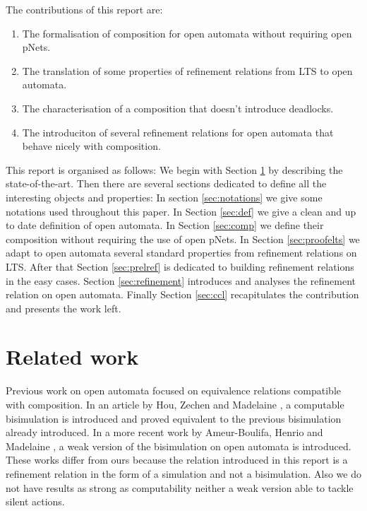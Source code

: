 \documentclass{article}
\begin{document}
The contributions of this report are:
\begin{enumerate}
\item The formalisation of composition for open automata without requiring open pNets.
\item The translation of some properties of refinement relations from LTS to open automata.
\item The characterisation of a composition that doesn't introduce deadlocks.
\item The introduciton of several refinement relations for open automata that behave nicely with composition.
\end{enumerate}
This report is organised as follows:
We begin with Section \ref{sec:sota} by describing the state-of-the-art.
Then there are several sections dedicated to define all the interesting objects and properties:
In section \ref{sec:notations} we give some notations used throughout this paper.
In Section \ref{sec:def} we give a clean and up to date definition of open automata.
In Section \ref{sec:comp} we define their composition without requiring the use of open pNets.
In Section \ref{sec:proofelts} we adapt to open automata several standard properties from refinement relations on LTS.
After that Section \ref{sec:prelref} is dedicated to building refinement relations in the easy cases.
Section \ref{sec:refinement} introduces and analyses the refinement relation on open automata.
Finally Section \ref{sec:ccl} recapitulates the contribution and presents the work left.


\section{Related work}\label{sec:sota}
Previous work on open automata focused on equivalence relations compatible with composition.
In an article by Hou, Zechen and Madelaine \cite{10.1145/3372884.3373161}, a computable bisimulation is introduced and proved equivalent to the previous bisimulation already introduced.
In a more recent work by Ameur-Boulifa, Henrio and Madelaine \cite{2007.10770}, a weak version of the bisimulation on open automata is introduced.
These works differ from ours because the relation introduced in this report is a refinement relation in the form of a simulation and not a bisimulation.
Also we do not have results as strong as computability neither a weak version able to tackle silent actions.
\end{document}
